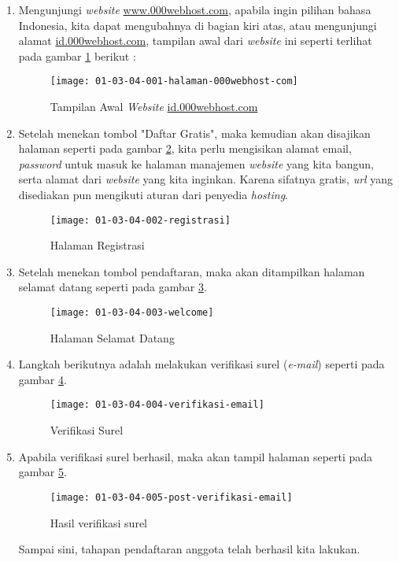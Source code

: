 \begin{enumerate}
	\item Mengunjungi \textit{website} \url{www.000webhost.com}, apabila ingin pilihan bahasa Indonesia, kita dapat mengubahnya di bagian kiri atas, atau mengunjungi alamat \url{id.000webhost.com}, tampilan awal dari \textit{website} ini seperti terlihat pada gambar \ref{fig:01-03-04-001} berikut :
	
	\begin{figure}[H]
		\centering
		\texttt{[image: 01-03-04-001-halaman-000webhost-com]}
		\caption{Tampilan Awal \textit{Website} \url{id.000webhost.com}}
		\label{fig:01-03-04-001}
	\end{figure}
	
	\item Setelah menekan tombol "Daftar Gratis", maka kemudian akan disajikan halaman seperti pada gambar \ref{fig:01-03-04-002}, kita perlu mengisikan alamat email, \textit{password} untuk masuk ke halaman manajemen \textit{website} yang kita bangun, serta alamat dari \textit{website} yang kita inginkan. Karena sifatnya gratis, \textit{url} yang disediakan pun mengikuti aturan dari penyedia \textit{hosting}.
	
	\begin{figure}[H]
		\centering
		\texttt{[image: 01-03-04-002-registrasi]}
		\caption{Halaman Registrasi}
		\label{fig:01-03-04-002}
	\end{figure}
	
	\item Setelah menekan tombol pendaftaran, maka akan ditampilkan halaman selamat datang seperti pada gambar \ref{fig:01-03-04-003}.
	
	\begin{figure}[H]
		\centering
		\texttt{[image: 01-03-04-003-welcome]}
		\caption{Halaman Selamat Datang}
		\label{fig:01-03-04-003}
	\end{figure}
	
	\item Langkah berikutnya adalah melakukan verifikasi surel (\textit{e-mail}) seperti pada gambar \ref{fig:01-03-04-004}.
	
	\begin{figure}[H]
		\centering
		\texttt{[image: 01-03-04-004-verifikasi-email]}
		\caption{Verifikasi Surel}
		\label{fig:01-03-04-004}
	\end{figure}
	
	\item Apabila verifikasi surel berhasil, maka akan tampil halaman seperti pada gambar \ref{fig:01-03-04-005}.
	
	\begin{figure}[H]
		\centering
		\texttt{[image: 01-03-04-005-post-verifikasi-email]}
		\caption{Hasil verifikasi surel}
		\label{fig:01-03-04-005}
	\end{figure}
	
	Sampai sini, tahapan pendaftaran anggota telah berhasil kita lakukan.
	
\end{enumerate}
		
